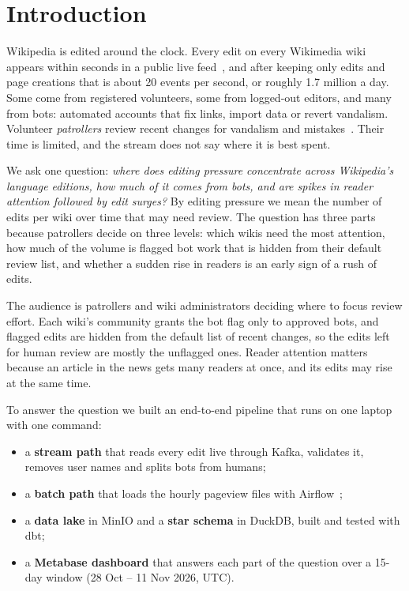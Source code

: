 \section{Introduction}\label{sec:intro}

Wikipedia is edited around the clock. Every edit on every Wikimedia wiki appears within seconds in a
public live feed~\cite{wikimedia2026eventstreams}, and after keeping only edits and page creations that is
about 20 events per second, or roughly 1.7 million a day. Some come from registered volunteers, some from
logged-out editors, and many from bots: automated accounts that fix links, import data or revert
vandalism. Volunteer \emph{patrollers} review recent changes for vandalism and
mistakes~\cite{wikipedia2026patrol}. Their time is limited, and the stream does not say where it is best
spent.

We ask one question: \emph{where does editing pressure concentrate across Wikipedia's language editions,
how much of it comes from bots, and are spikes in reader attention followed by edit surges?} By editing
pressure we mean the number of edits per wiki over time that may need review. The question has three
parts because patrollers decide on three levels: which wikis need the most attention, how much of the
volume is flagged bot work that is hidden from their default review list, and whether a sudden rise in readers is an early sign of
a rush of edits.

The audience is patrollers and wiki administrators deciding where to focus review effort. Each wiki's
community grants the bot flag only to approved bots, and flagged edits are hidden from the default list of
recent changes, so the edits left for human review are mostly the unflagged ones. Reader attention matters
because an article in the news gets many readers at once, and its edits may rise at the same time.

To answer the question we built an end-to-end pipeline that runs on one laptop with one command:
\begin{itemize}
  \item a \textbf{stream path} that reads every edit live through Kafka, validates it, removes user names
    and splits bots from humans;
  \item a \textbf{batch path} that loads the hourly pageview files with Airflow~\cite{wikimedia2026pageviews};
  \item a \textbf{data lake} in MinIO and a \textbf{star schema} in DuckDB, built and tested with dbt;
  \item a \textbf{Metabase dashboard} that answers each part of the question over a 15-day window
    (28 Oct -- 11 Nov 2026, UTC).
\end{itemize}
